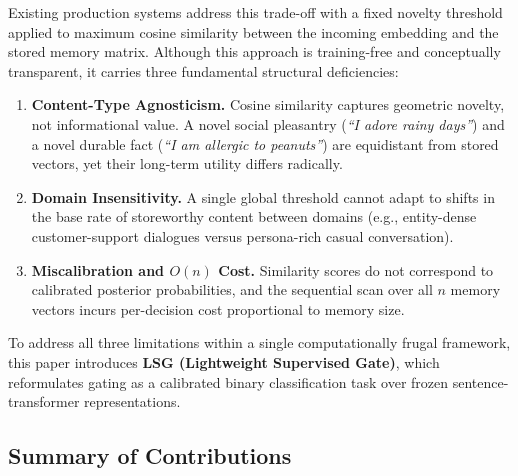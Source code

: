 \documentclass[conference]{IEEEtran}
\begin{document}
Existing production systems address this trade-off with a
fixed novelty threshold applied to maximum cosine
similarity between the incoming embedding and the stored
memory matrix.
Although this approach is training-free and conceptually
transparent, it carries three fundamental structural
deficiencies:

\begin{enumerate}
  \item \textbf{Content-Type Agnosticism.}
    Cosine similarity captures geometric novelty, not
    informational value.
    A novel social pleasantry (\emph{``I adore rainy days''})
    and a novel durable fact (\emph{``I am allergic to
    peanuts''}) are equidistant from stored vectors, yet
    their long-term utility differs radically.

  \item \textbf{Domain Insensitivity.}
    A single global threshold cannot adapt to shifts in
    the base rate of storeworthy content between domains
    (e.g., entity-dense customer-support dialogues versus
    persona-rich casual conversation).

  \item \textbf{Miscalibration and $O(n)$ Cost.}
    Similarity scores do not correspond to calibrated
    posterior probabilities, and the sequential scan over
    all $n$ memory vectors incurs per-decision cost
    proportional to memory size.
\end{enumerate}

To address all three limitations within a single
computationally frugal framework, this paper introduces
\textbf{LSG (Lightweight Supervised Gate)}, which
reformulates gating as a calibrated binary classification
task over frozen sentence-transformer representations.

\subsection*{Summary of Contributions}
\end{document}
